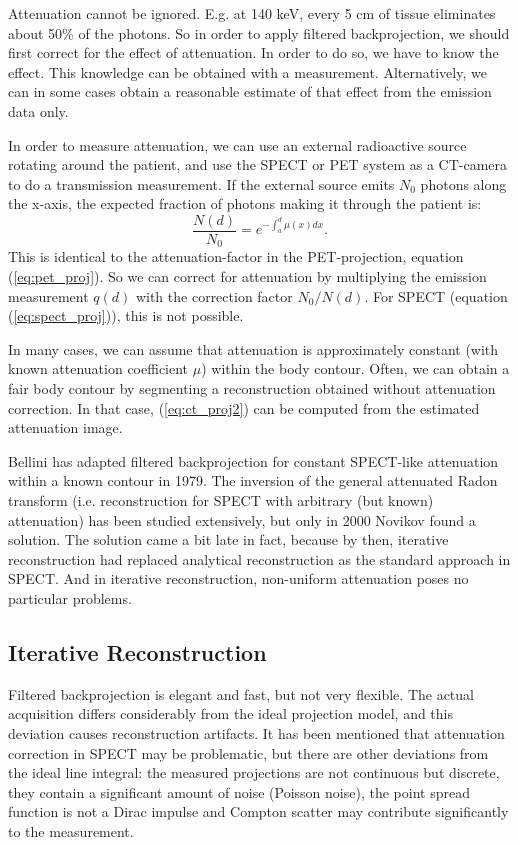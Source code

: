 \documentclass[11pt,oneside]{book}
\begin{document}
Attenuation cannot be ignored. E.g. at 140 keV, every 5 cm of tissue eliminates
about 50\% of the photons. So in order to apply filtered backprojection, we
should first correct for the effect of attenuation. In order to do so, we have
to know the effect. This knowledge can be obtained with a measurement.
Alternatively, we can in some cases obtain a reasonable estimate of that effect
from the emission data only.

In order to measure attenuation, we can use an external radioactive source
rotating around the patient, and use the SPECT or PET system as a CT-camera to
do a transmission measurement. If the external source emits $N_0$ photons
along the x-axis, the expected fraction of photons making it through the
patient is:
\begin{equation}
\frac{N(d)}{N_0} = e^{-\int_a^d \mu(x) dx} \label{eq:ct_proj2}.
\end{equation}
This is identical to the attenuation-factor in the PET-projection, equation
(\ref{eq:pet_proj}). So we can correct for attenuation by multiplying the
emission measurement $q(d)$ with the correction factor $N_0 / N(d)$.
For SPECT (equation (\ref{eq:spect_proj})), this is not possible.

In many cases, we can assume that attenuation is approximately constant (with
known attenuation coefficient $\mu$) within the body contour. Often, we can
obtain a fair body contour by segmenting a reconstruction obtained without
attenuation correction. In that case, (\ref{eq:ct_proj2}) can be computed from
the estimated attenuation image.

Bellini has adapted filtered backprojection for constant SPECT-like attenuation
within a known contour in 1979. The inversion of the general attenuated Radon
transform (i.e. reconstruction for SPECT with arbitrary (but known) attenuation) has
been studied extensively, but only in 2000 Novikov found a solution. The solution
came a bit late in fact, because by then, iterative reconstruction had replaced
analytical reconstruction as the standard approach in SPECT. And in iterative
reconstruction, non-uniform attenuation poses no particular problems.

\subsection{Iterative Reconstruction} \label{sec:iterrecon}
Filtered backprojection is elegant and fast, but not very
flexible. The actual acquisition differs considerably from the ideal
projection model, and this deviation causes reconstruction
artifacts. It has been mentioned that attenuation correction in SPECT
may be problematic, but there are other deviations from the ideal line
integral: the measured projections are not continuous but discrete,
they contain a significant amount of noise (Poisson noise), the point
spread function is not a Dirac impulse and Compton scatter may
contribute significantly to the measurement.
\end{document}
